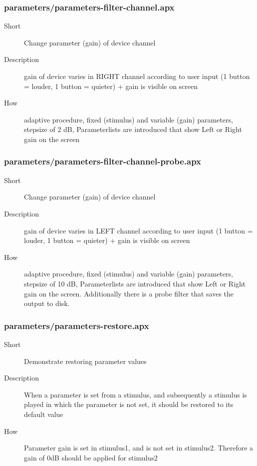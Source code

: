 \subsubsection{parameters/parameters-filter-channel.apx}
\begin{description}
\item[Short] 
 Change parameter (gain) of device channel
\item[Description] 
 gain of device varies in RIGHT channel according to user input (1 button = louder, 1 button = quieter) + gain is visible on screen
\item[How] 
 adaptive procedure, fixed (stimulus) and variable (gain) parameters, stepsize of 2 dB, Parameterlists are introduced that show Left or Right gain on the screen
\end{description}

\subsubsection{parameters/parameters-filter-channel-probe.apx}
\begin{description}
\item[Short] 
  Change parameter (gain) of device channel
\item[Description] 
 gain of device varies in LEFT channel according to user input (1 button = louder, 1 button = quieter) + gain is visible on screen
\item[How] 
 adaptive procedure, fixed (stimulus) and variable (gain) parameters, stepsize of 10 dB, Parameterlists are introduced that show Left or Right gain on the screen. Additionally there is a probe filter that saves the output to disk.
\end{description}

\subsubsection{parameters/parameters-restore.apx}
\begin{description}
\item[Short] 
 Demonstrate restoring parameter values
\item[Description] 
 When a parameter is set from a stimulus, and subsequently a stimulus is played in which the parameter is not set, it should be restored to its default value
\item[How] 
 Parameter gain is set in stimulus1, and is not set in stimulus2. Therefore a gain of 0dB should be applied for stimulus2
\end{description}


